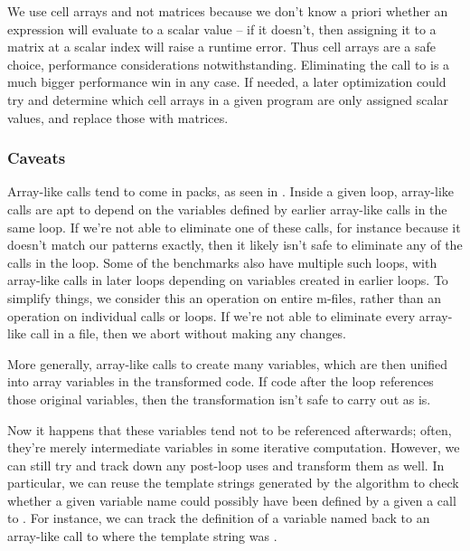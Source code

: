 We use cell arrays and not matrices because we don't know a priori whether an
expression will evaluate to a scalar value -- if it doesn't, then assigning it
to a matrix at a scalar index will raise a runtime error. Thus cell arrays are
a safe choice, performance considerations notwithstanding. Eliminating the call
to  is a much bigger performance win in any case. If needed, a later
optimization could try and determine which cell arrays in a given program are
only assigned scalar values, and replace those with matrices.

\subsubsection{Caveats}

Array-like calls tend to come in packs, as seen in .
Inside a given loop, array-like calls are apt to depend on the variables
defined by earlier array-like calls in the same loop. If we're not able to
eliminate one of these calls, for instance because it doesn't match our
patterns exactly, then it likely isn't safe to eliminate any of the calls in
the loop. Some of the benchmarks also have multiple such loops, with array-like
calls in later loops depending on variables created in earlier loops. To
simplify things, we consider this an operation on entire m-files, rather than
an operation on individual calls or loops. If we're not able to eliminate every
array-like call in a file, then we abort without making any changes.

More generally, array-like calls to  create many variables, which
are then unified into array variables in the transformed code. If code after
the loop references those original variables, then the transformation isn't
safe to carry out as is.

Now it happens that these variables tend not to be referenced afterwards;
often, they're merely intermediate variables in some iterative computation.
However, we can still try and track down any post-loop uses and transform them
as well. In particular, we can reuse the template strings generated by the
algorithm to check whether a given variable name could possibly have been
defined by a given a call to . For instance, we can track the
definition of a variable named  back to an array-like call to
 where the template string was .

